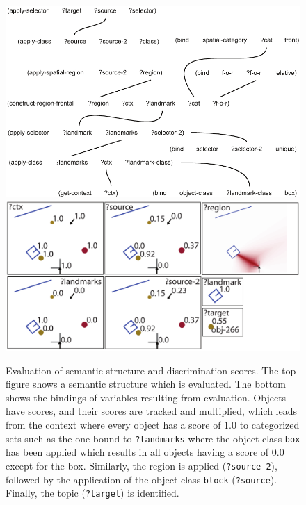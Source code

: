 \begin{figure}
\begin{center}
\includegraphics[width=0.9\columnwidth]{figs/semantic-structure-in-front-of-the-box-relative}
\includegraphics[width=0.9\columnwidth]{figs/semantic-structure-in-front-of-the-box-relative-evaluation}
\end{center}
\caption[Evaluation of semantic structure and discrimination scores]{
Evaluation of semantic structure and discrimination scores. The top figure 
shows a semantic structure which is evaluated.
The bottom shows the bindings of variables resulting from evaluation. 
Objects have scores, and their scores are tracked and multiplied, which leads from the
context where every object has a score of $1.0$ to categorized sets such as the one
bound to {\footnotesize\tt ?landmarks} where the object class {\footnotesize\tt box} has been applied which 
results in all objects having a score of $0.0$ except for the box. Similarly, the region is applied
({\footnotesize\tt ?source-2}), followed by the application of the object class {\footnotesize\tt block}
({\footnotesize\tt ?source}). Finally, the topic ({\footnotesize\tt ?target}) is identified.}
\label{f:disc-score}
\end{figure}

